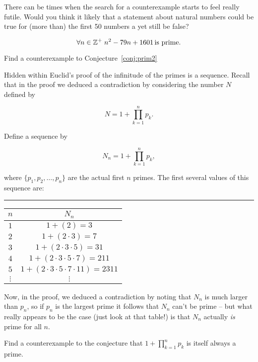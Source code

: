 There can be times when the search for a counterexample starts to feel
really futile.  Would you think it likely that a statement about
natural numbers could be true for (more than) the first 50 numbers
a yet still be false?  

\begin{conj}
\label{conj:prim2}
\[ \forall n \in {\mathbb Z}^+ \; n^2 - 79n + 1601 \, \mbox{is prime.} \]
\end{conj}

\begin{exer}
Find a counterexample to Conjecture~\ref{conj:prim2}
\end{exer}

Hidden within Euclid's proof of the infinitude of the primes is
a sequence.  Recall that in the proof we deduced a contradiction
by considering the number $N$ defined by 

\[  N = 1 + \prod_{k=1}^n p_k. \]

Define a sequence by

\[  N_n  = 1 + \prod_{k=1}^n p_k, \]

where $\{p_1, p_2, \ldots , p_n\}$ are the actual first $n$ primes.
The first several values of this sequence are:

\rule{72pt}{0pt} \begin{tabular}{c|c}
 $n$ & $N_n$ \\ \hline
 $1$ & $1+(2) = 3$ \\
 $2$ & $1+(2\cdot 3) = 7$\\
 $3$ & $1+(2\cdot 3\cdot 5) = 31$\\
 $4$ & $1+(2\cdot 3\cdot 5\cdot 7) = 211$\\
 $5$ & $1+(2\cdot 3\cdot 5\cdot 7\cdot 11) = 2311$\\
$\vdots$ & $\vdots$ \\
\end{tabular}

Now, in the proof, we deduced a contradiction by noting that $N_n$ is
much larger than $p_n$, so if $p_n$ is the largest prime it follows that
$N_n$ can't be prime -- but what really appears to be the case (just look 
at that table!) is that $N_n$ actually \emph{is} prime for all $n$. 

\begin{exer}
Find a counterexample to the conjecture that $1+\prod_{k=1}^n p_k$
is itself always a prime.
\end{exer}


\clearpage


